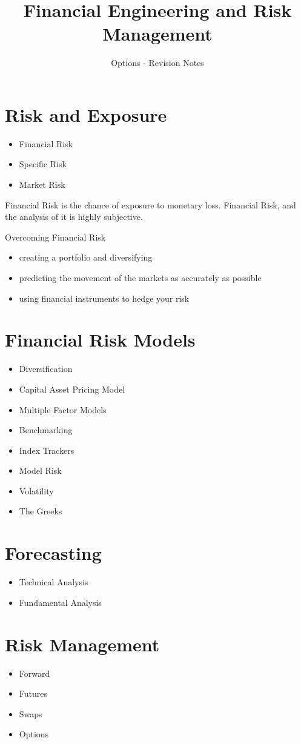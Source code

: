 \documentclass[11pt]{article} %
\title{Financial Engineering and Risk Management}
\author{Options - Revision Notes}
\begin{document}
\maketitle
\tableofcontents


\section{Risk and Exposure}

\begin{itemize}
\item Financial Risk
\item Specific Risk
\item Market Risk
\end{itemize}

Financial Risk is the chance of exposure to monetary loss. Financial Risk, and the analysis of it is highly subjective. 

Overcoming Financial Risk
\begin{itemize}
\item creating a portfolio and diversifying
\item predicting the movement of the markets as accurately as possible
\item using financial instruments to hedge your risk
\end{itemize}
\section{Financial Risk Models}

\begin{itemize}
\item Diversification
\item Capital Asset Pricing Model
\item Multiple Factor Models
\item Benchmarking
\item Index Trackers
\item Model Risk
\item Volatility
\item The Greeks
\end{itemize}


\section{Forecasting}
\begin{itemize}
\item Technical Analysis
\item Fundamental Analysis
\end{itemize}

\section{Risk Management}
\begin{itemize}
\item Forward
\item Futures
\item Swaps
\item Options
\end{itemize}
\end{document}
